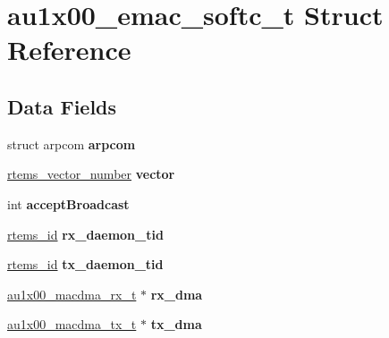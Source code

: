 \hypertarget{structau1x00__emac__softc__t}{}\section{au1x00\+\_\+emac\+\_\+softc\+\_\+t Struct Reference}
\label{structau1x00__emac__softc__t}
\subsection*{Data Fields}
\begin{DoxyCompactItemize}
\item 
\mbox{\label{structau1x00__emac__softc__t_a7648176bd5a7d02ac0df3f9b512c2484}} 
struct arpcom {\bfseries arpcom}
\item 
\mbox{\label{structau1x00__emac__softc__t_a55aff0644fe9f1d7844b49879fca97f7}} 
\mbox{\hyperlink{group__ClassicINTR_ga3e434c197d99f128e78cae4d9358bd8b}{rtems\+\_\+vector\+\_\+number}} {\bfseries vector}
\item 
\mbox{\label{structau1x00__emac__softc__t_a1d9d74dbb6d7406402f13cadf586d55a}} 
int {\bfseries accept\+Broadcast}
\item 
\mbox{\label{structau1x00__emac__softc__t_a9d94dea743b5ec2a87e1434126cf6e0d}} 
\mbox{\hyperlink{group__ClassicTasks_gab20892b814dced7dd4e5b9bf42becd57}{rtems\+\_\+id}} {\bfseries rx\+\_\+daemon\+\_\+tid}
\item 
\mbox{\label{structau1x00__emac__softc__t_a7a0fbe6e4849d73d03eecf7505eb9550}} 
\mbox{\hyperlink{group__ClassicTasks_gab20892b814dced7dd4e5b9bf42becd57}{rtems\+\_\+id}} {\bfseries tx\+\_\+daemon\+\_\+tid}
\item 
\mbox{\label{structau1x00__emac__softc__t_afd313600fd37825a7a7cb634251e724d}} 
\mbox{\hyperlink{structau1x00__macdma__rx__t}{au1x00\+\_\+macdma\+\_\+rx\+\_\+t}} $\ast$ {\bfseries rx\+\_\+dma}
\item 
\mbox{\label{structau1x00__emac__softc__t_ad0189d21fac5ec10686eb64464a7a6bb}} 
\mbox{\hyperlink{structau1x00__macdma__tx__t}{au1x00\+\_\+macdma\+\_\+tx\+\_\+t}} $\ast$ {\bfseries tx\+\_\+dma}

\end{DoxyCompactItemize}
